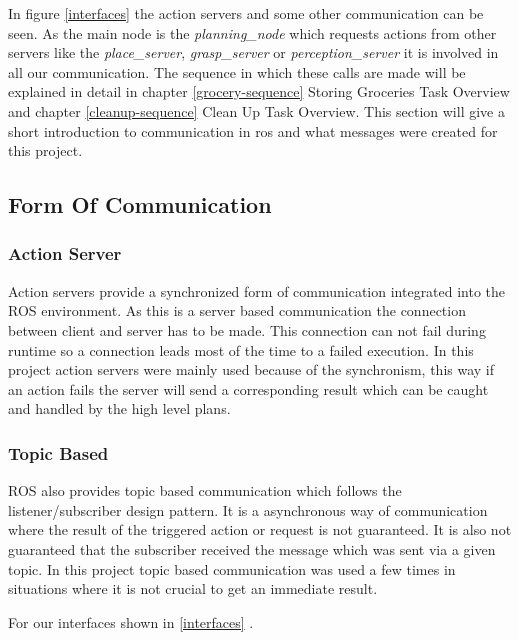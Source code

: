 \documentclass[main.tex]{subfiles}
\begin{document}
		In figure \ref{interfaces} the action servers and some other communication can be seen. As the main node is the \textit{planning\_node} which requests actions from other servers like the \textit{place\_server}, \textit{grasp\_server} or \textit{perception\_server} it is involved in all our communication. The sequence in which these calls are made will be explained in detail in chapter \ref{grocery-sequence} Storing Groceries Task Overview and chapter \ref{cleanup-sequence} Clean Up Task Overview. This section will give a short introduction to communication in ros and what messages were created for this project.

		\subsection{Form Of Communication}
		
			\subsubsection{Action Server}
			
			Action servers provide a synchronized form of communication integrated into the ROS environment. As this is a server based communication the connection between client and server has to be made. This connection can not fail during runtime so a connection leads most of the time to a failed execution. In this project action servers were mainly used because of the synchronism, this way if an action fails the server will send a corresponding result which can be caught and handled by the high level plans.
			
			\subsubsection{Topic Based}
			
			ROS also provides topic based communication which follows the listener/subscriber design pattern. It is a asynchronous way of communication where the result of the triggered action or request is not guaranteed. It is also not guaranteed that the subscriber received the message which was sent via a given topic. In this project topic based communication was used a few times in situations where it is not crucial to get an immediate result.  
		

		For our interfaces shown in \ref{interfaces} . 

		
		

	  		 

	\endgroup
\end{document}
